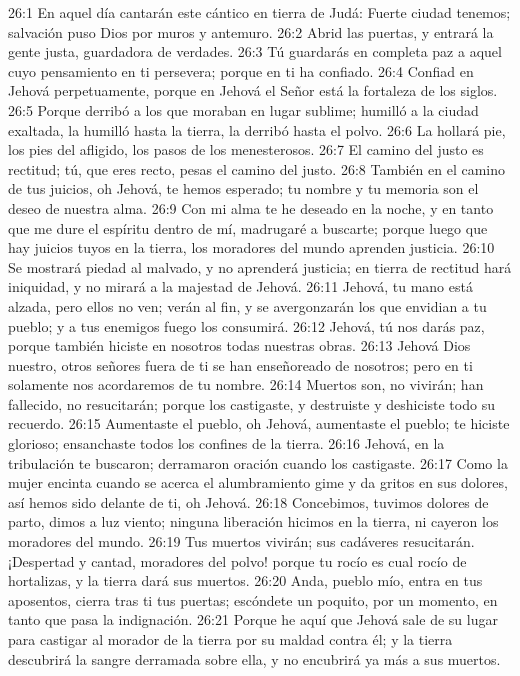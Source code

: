 26:1 En aquel día cantarán este cántico en tierra de Judá: Fuerte ciudad tenemos; salvación puso Dios por muros y antemuro. 
26:2 Abrid las puertas, y entrará la gente justa, guardadora de verdades. 
26:3 Tú guardarás en completa paz a aquel cuyo pensamiento en ti persevera; porque en ti ha confiado. 
26:4 Confiad en Jehová perpetuamente, porque en Jehová el Señor está la fortaleza de los siglos. 
26:5 Porque derribó a los que moraban en lugar sublime; humilló a la ciudad exaltada, la humilló hasta la tierra, la derribó hasta el polvo. 
26:6 La hollará pie, los pies del afligido, los pasos de los menesterosos. 
26:7 El camino del justo es rectitud; tú, que eres recto, pesas el camino del justo. 
26:8 También en el camino de tus juicios, oh Jehová, te hemos esperado; tu nombre y tu memoria son el deseo de nuestra alma. 
26:9 Con mi alma te he deseado en la noche, y en tanto que me dure el espíritu dentro de mí, madrugaré a buscarte; porque luego que hay juicios tuyos en la tierra, los moradores del mundo aprenden justicia. 
26:10 Se mostrará piedad al malvado, y no aprenderá justicia; en tierra de rectitud hará iniquidad, y no mirará a la majestad de Jehová. 
26:11 Jehová, tu mano está alzada, pero ellos no ven; verán al fin, y se avergonzarán los que envidian a tu pueblo; y a tus enemigos fuego los consumirá. 
26:12 Jehová, tú nos darás paz, porque también hiciste en nosotros todas nuestras obras. 
26:13 Jehová Dios nuestro, otros señores fuera de ti se han enseñoreado de nosotros; pero en ti solamente nos acordaremos de tu nombre. 
26:14 Muertos son, no vivirán; han fallecido, no resucitarán; porque los castigaste, y destruiste y deshiciste todo su recuerdo. 
26:15 Aumentaste el pueblo, oh Jehová, aumentaste el pueblo; te hiciste glorioso; ensanchaste todos los confines de la tierra. 
26:16 Jehová, en la tribulación te buscaron; derramaron oración cuando los castigaste. 
26:17 Como la mujer encinta cuando se acerca el alumbramiento gime y da gritos en sus dolores, así hemos sido delante de ti, oh Jehová. 
26:18 Concebimos, tuvimos dolores de parto, dimos a luz viento; ninguna liberación hicimos en la tierra, ni cayeron los moradores del mundo. 
26:19 Tus muertos vivirán; sus cadáveres resucitarán. ¡Despertad y cantad, moradores del polvo! porque tu rocío es cual rocío de hortalizas, y la tierra dará sus muertos. 
26:20 Anda, pueblo mío, entra en tus aposentos, cierra tras ti tus puertas; escóndete un poquito, por un momento, en tanto que pasa la indignación. 
26:21 Porque he aquí que Jehová sale de su lugar para castigar al morador de la tierra por su maldad contra él; y la tierra descubrirá la sangre derramada sobre ella, y no encubrirá ya más a sus muertos. 
